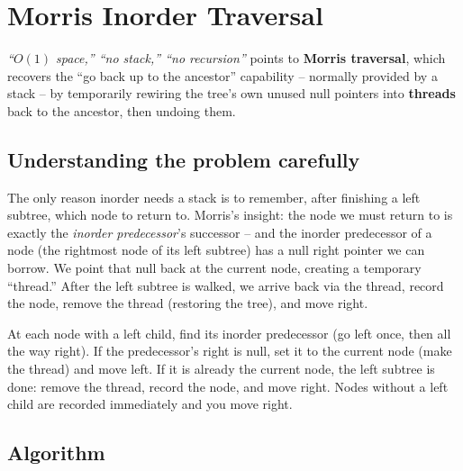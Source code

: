 \section{Morris Inorder Traversal}
\label{sec:trees-morris-inorder}


\begin{patternbox}
\emph{``$O(1)$ space,'' ``no stack,'' ``no recursion''} points to
\textbf{Morris traversal}, which recovers the ``go back up to the
ancestor'' capability -- normally provided by a stack -- by temporarily
rewiring the tree's own unused null pointers into \textbf{threads} back to
the ancestor, then undoing them.
\end{patternbox}

\subsection*{Understanding the problem carefully}

The only reason inorder needs a stack is to remember, after finishing a
left subtree, which node to return to. Morris's insight: the node we must
return to is exactly the \emph{inorder predecessor}'s successor -- and the
inorder predecessor of a node (the rightmost node of its left subtree) has
a null right pointer we can borrow. We point that null back at the current
node, creating a temporary ``thread.'' After the left subtree is walked, we
arrive back via the thread, record the node, remove the thread (restoring
the tree), and move right.

\begin{ideabox}
At each node with a left child, find its inorder predecessor (go left once,
then all the way right). If the predecessor's right is null, set it to the
current node (make the thread) and move left. If it is already the current
node, the left subtree is done: remove the thread, record the node, and
move right. Nodes without a left child are recorded immediately and you
move right.
\end{ideabox}

\subsection*{Algorithm}

